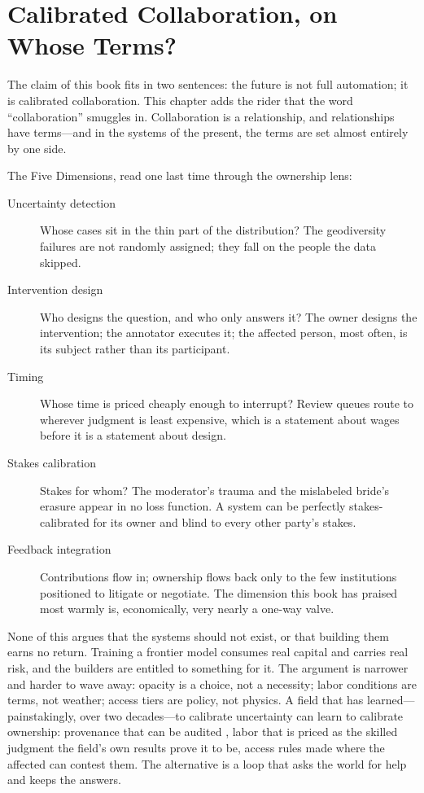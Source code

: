 \section{Calibrated Collaboration, on Whose Terms?}
\label{sec:ch18-whose-terms}

The claim of this book fits in two sentences: the future is not full automation; it is calibrated collaboration. This chapter adds the rider that the word ``collaboration'' smuggles in. Collaboration is a relationship, and relationships have terms---and in the systems of the present, the terms are set almost entirely by one side.

The Five Dimensions, read one last time through the ownership lens:

\begin{description}
  \item[Uncertainty detection] Whose cases sit in the thin part of the distribution? The geodiversity failures are not randomly assigned; they fall on the people the data skipped.
  \item[Intervention design] Who designs the question, and who only answers it? The owner designs the intervention; the annotator executes it; the affected person, most often, is its subject rather than its participant.
  \item[Timing] Whose time is priced cheaply enough to interrupt? Review queues route to wherever judgment is least expensive, which is a statement about wages before it is a statement about design.
  \item[Stakes calibration] Stakes for whom? The moderator's trauma and the mislabeled bride's erasure appear in no loss function. A system can be perfectly stakes-calibrated for its owner and blind to every other party's stakes.
  \item[Feedback integration] Contributions flow in; ownership flows back only to the few institutions positioned to litigate or negotiate. The dimension this book has praised most warmly is, economically, very nearly a one-way valve.
\end{description}

None of this argues that the systems should not exist, or that building them earns no return. Training a frontier model consumes real capital and carries real risk, and the builders are entitled to something for it. The argument is narrower and harder to wave away: opacity is a choice, not a necessity; labor conditions are terms, not weather; access tiers are policy, not physics. A field that has learned---painstakingly, over two decades---to calibrate uncertainty can learn to calibrate ownership: provenance that can be audited \autocite{gebru2021datasheets}, labor that is priced as the skilled judgment the field's own results prove it to be, access rules made where the affected can contest them. The alternative is a loop that asks the world for help and keeps the answers.

